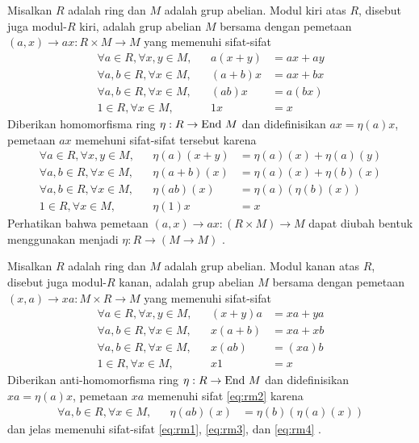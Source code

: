 \begin{defn}
Misalkan $R$ adalah ring dan $M$ adalah grup abelian. Modul kiri atas $R$, disebut juga modul-$R$ kiri, adalah grup abelian $M$ bersama dengan pemetaan ${(a, x) \to ax : R \times M \to M}$ yang memenuhi sifat-sifat
\begingroup
\allowdisplaybreaks
\begin{align*}
    \forall a \in R, \forall x,y \in M,&& a(x + y) &= ax + ay \\
    \forall a,b \in R, \forall x \in M,&& (a + b)x &= ax + bx \\
    \forall a,b \in R, \forall x \in M,&& (ab)x &= a(bx) \\
    1 \in R, \forall x \in M,&& 1x &= x
\end{align*}
\endgroup
Diberikan homomorfisma ring ${\eta: R \to {\mathrm{End}\ M}}$ dan didefinisikan ${ax = \eta(a)x}$, pemetaan $ax$ memehuni sifat-sifat tersebut karena
\begingroup
\allowdisplaybreaks
\begin{align*}
    \forall a \in R, \forall x,y \in M,&& \eta(a)(x + y) &= \eta(a)(x) + \eta(a)(y) \\
    \forall a,b \in R, \forall x \in M,&& \eta(a + b)(x) &= \eta(a)(x) + \eta(b)(x) \\
    \forall a,b \in R, \forall x \in M,&& \eta(ab)(x) &= \eta(a)(\eta(b)(x)) \\
    1 \in R, \forall x \in M,&& \eta(1)x &= x
\end{align*}
\endgroup
Perhatikan bahwa pemetaan ${(a, x) \to ax : (R \times M) \to M}$ dapat diubah bentuk menggunakan  menjadi ${\eta : R \to (M \to M)}$ \citep{Avigad2024,Jacobson1995}.
\end{defn}

\begin{defn}
Misalkan $R$ adalah ring dan $M$ adalah grup abelian. Modul kanan atas $R$, disebut juga modul-$R$ kanan, adalah grup abelian $M$ bersama dengan pemetaan ${(x, a) \to xa : M \times R \to M}$ yang memenuhi sifat-sifat
\begingroup
\allowdisplaybreaks
\begin{align}
    \forall a \in R, \forall x,y \in M,&& (x + y)a &= xa + ya \label{eq:rm1} \\
    \forall a,b \in R, \forall x \in M,&& x(a + b) &= xa + xb \label{eq:rm2} \\
    \forall a,b \in R, \forall x \in M,&& x(ab) &= (xa)b \label{eq:rm3}  \\
    1 \in R, \forall x \in M,&& x1 &= x \label{eq:rm4}
\end{align}
\endgroup
Diberikan anti-homomorfisma ring ${\eta: R \to {\mathrm{End}\ M}}$ dan didefinisikan ${xa = \eta(a)x}$, pemetaan $xa$ memenuhi sifat \ref{eq:rm2} karena
\begin{align*}
    \forall a,b \in R, \forall x \in M,&& \eta(ab)(x) &= \eta(b)(\eta(a)(x))
\end{align*}
dan jelas memenuhi sifat-sifat \ref{eq:rm1}, \ref{eq:rm3}, dan \ref{eq:rm4} \citep{Jacobson1995}.
\end{defn}

